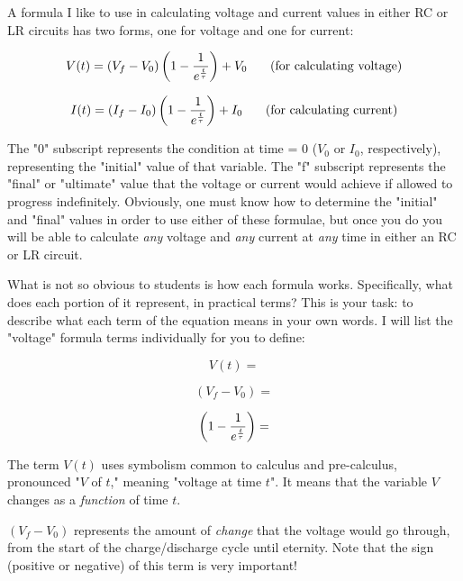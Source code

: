 

A formula I like to use in calculating voltage and current values in either RC or LR circuits has two forms, one for voltage and one for current:

$$V(t) = \left( V_f - V_0 \right) \left( 1 - {1 \over {e^{t \over \tau}}} \right) + V_0 \hbox{ \hskip 15pt (for calculating voltage)}$$

$$I(t) = \left( I_f - I_0 \right) \left( 1 - {1 \over {e^{t \over \tau}}} \right) + I_0 \hbox{ \hskip 15pt (for calculating current)}$$

The "0" subscript represents the condition at time = 0 ($V_0$ or $I_0$, respectively), representing the "initial" value of that variable.  The "f" subscript represents the "final" or "ultimate" value that the voltage or current would achieve if allowed to progress indefinitely.  Obviously, one must know how to determine the "initial" and "final" values in order to use either of these formulae, but once you do you will be able to calculate {\it any} voltage and {\it any} current at {\it any} time in either an RC or LR circuit.

What is not so obvious to students is how each formula works.  Specifically, what does each portion of it represent, in practical terms?  This is your task: to describe what each term of the equation means in your own words.  I will list the "voltage" formula terms individually for you to define:

$$V(t) = $$

$$\left( V_f - V_0 \right) = $$

$$\left( 1 - {1 \over {e^{t \over \tau}}} \right) = $$







The term $V(t)$ uses symbolism common to calculus and pre-calculus, pronounced "$V$ of $t$," meaning "voltage at time $t$".  It means that the variable $V$ changes as a {\it function} of time $t$.

$\left( V_f - V_0 \right)$ represents the amount of {\it change} that the voltage would go through, from the start of the charge/discharge cycle until eternity.  Note that the sign (positive or negative) of this term is very important!

